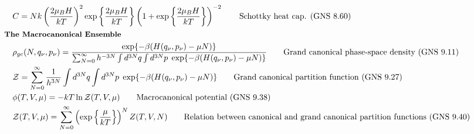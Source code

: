 \documentclass[10pt]{article}
\newcommand{\lrp}[1]{\left( #1 \right)}
\newcommand{\lrc}[1]{\left\{ #1 \right\}}
\begin{document}
\begin{multicols}{2}
\begin{align*}
		& C = Nk \lrp{\frac{2 \mu_B H}{kT}}^2 \exp \lrc{\frac{2 \mu_B H}{kT}} \lrp{1 + \exp\lrc{\frac{2 \mu_B H}{kT}}}^{-2}		\tag*{Schottky heat cap. (GNS 8.60)} \\
	& \small \hspace{-10pt} \textbf{The Macrocanonical Ensemble} \small \\
		& \rho_{gc}(N, q_\nu, p_\nu) = \frac{\exp \{ -\beta(H(q_\nu, p_\nu) -\mu N) \}}{\sum_{N=0}^{\infty} h^{-3N} \int d^{3N} q \int d^{3N}p \; \exp \{ -\beta(H(q_\nu, p_\nu) -\mu N) \}} \tag*{Grand canonical phase-space density (GNS 9.11)} \\
		& \mathcal{Z} = \sum_{N=0}^{\infty} \frac{1}{h^{3N}} \int d^{3N}q  \int d^{3N}p \; \exp \{ -\beta(H(q_\nu, p_\nu) -\mu N) \}	\tag*{Grand canonical partition function (GNS 9.27)} \\
		& \phi(T,V,\mu) = -kT \ln \mathcal{Z}(T,V,\mu)	\tag*{Macrocanonical potential (GNS 9.38)} \\
		& \mathcal{Z}(T,V,\mu) = \sum_{N=0}^{\infty} \lrp{\exp\lrc{\frac{\mu}{kT}}}^N Z(T,V,N)	\tag*{Relation between canonical and grand canonical partition functions (GNS 9.40)} \\
	\end{align*}
	
\end{multicols}
 
\end{document}
